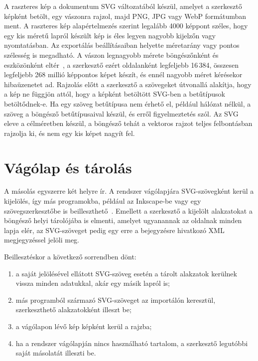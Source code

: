 A raszteres kép a dokumentum SVG változatából készül, amelyet a szerkesztő képként betölt, egy vászonra rajzol, majd PNG, JPG vagy WebP formátumban ment. A raszteres kép alapértelmezés szerint legalább 4000 képpont széles, hogy egy kis méretű lapról készült kép is éles legyen nagyobb kijelzőn vagy nyomtatásban. Az exportálás beállításaiban helyette méretarány vagy pontos szélesség is megadható. A vászon legnagyobb mérete böngészőnként és eszközönként eltér~\cite{mdn-canvas}, a szerkesztő ezért oldalanként legfeljebb 16\,384, összesen legfeljebb 268 millió képpontos képet készít, és ennél nagyobb méret kérésekor hibaüzenetet ad. Rajzolás előtt a szerkesztő a szövegeket útvonallá alakítja, hogy a kép ne függjön attól, hogy a képként betöltött SVG-ben a betűtípusok betöltődnek-e. Ha egy szöveg betűtípusa nem érhető el, például hálózat nélkül, a szöveg a böngésző betűtípusaival készül, és erről figyelmeztetés szól. Az SVG eleve a célméretben készül, a böngésző tehát a vektoros rajzot teljes felbontásban rajzolja ki, és nem egy kis képet nagyít fel.

\section{Vágólap és tárolás}
\label{sec:clipboard_storage}

A másolás egyszerre két helyre ír. A rendszer vágólapjára SVG-szövegként kerül a kijelölés, így más programokba, például az Inkscape-be vagy egy szövegszerkesztőbe is beilleszthető~\cite{mdn-clipboard}. Emellett a szerkesztő a kijelölt alakzatokat a böngésző helyi tárolójába is elmenti, amelyet ugyanannak az oldalnak minden lapja elér, az SVG-szöveget pedig egy erre a bejegyzésre hivatkozó XML megjegyzéssel jelöli meg.

Beillesztéskor a következő sorrendben dönt:

\begin{enumerate}
\item a saját jelölésével ellátott SVG-szöveg esetén a tárolt alakzatok kerülnek vissza minden adatukkal, akár egy másik lapról is;
\item más programból származó SVG-szöveget az importálón keresztül, szerkeszthető alakzatokként illeszt be;
\item a vágólapon lévő kép képként kerül a rajzba;
\item ha a rendszer vágólapján nincs használható tartalom, a szerkesztő legutóbbi saját másolatát illeszti be.
\end{enumerate}

